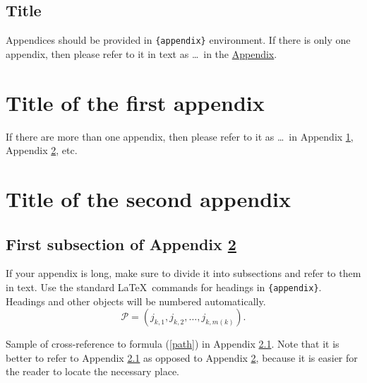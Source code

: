 \documentclass[qe,nameyear,draft]{econsocart}
\theoremstyle{plain}
\theoremstyle{remark}
\begin{document}
\begin{appendix}
\section*{Title}\label{appn} %
Appendices should be provided in \verb|{appendix}| environment. If there is only one appendix,
then please refer to it in text as \ldots\ in the \hyperref[appn]{Appendix}.
\end{appendix}

\begin{appendix}
\section{Title of the first appendix}\label{appA}
If there are more than one appendix, then please refer to it
as \ldots\ in Appendix \ref{appA}, Appendix \ref{appB}, etc.

\section{Title of the second appendix}\label{appB}
\subsection{First subsection of Appendix \protect\ref{appB}}\label{appB1}

If your appendix is long, make sure to divide it into subsections and refer to them in text. Use the standard \LaTeX\ commands for headings in \verb|{appendix}|.
Headings and other objects will be numbered automatically.
\begin{equation}
\mathcal{P}=(j_{k,1},j_{k,2},\dots,j_{k,m(k)}). \label{path}
\end{equation}

Sample of cross-reference to formula (\ref{path}) in Appendix \ref{appB1}.
Note that it is better to refer to Appendix \ref{appB1} as opposed to Appendix \ref{appB}, because it is easier for the reader to locate the necessary place. \end{appendix}
\end{document}
